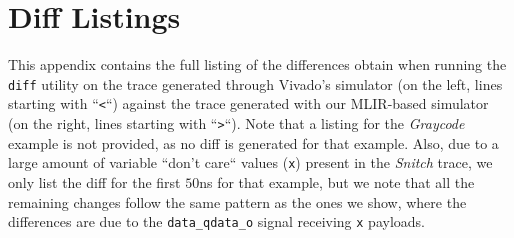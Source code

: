 \chapter{Diff Listings}
\label{app:diffs}

This appendix contains the full listing of the differences obtain when running the \texttt{diff} utility on the trace generated through Vivado's simulator (on the left, lines starting with “\texttt{<}“) against the trace generated with our MLIR-based simulator (on the right, lines starting with “\texttt{>}“). Note that a listing for the \textit{Graycode} example is not provided, as no diff is generated for that example. Also, due to a large amount of variable “don't care“ values (\texttt{x}) present in the \textit{Snitch} trace, we only list the diff for the first $50$ns for that example, but we note that all the remaining changes follow the same pattern as the ones we show, where the differences are due to the \texttt{data\_qdata\_o} signal receiving \texttt{x} payloads.





